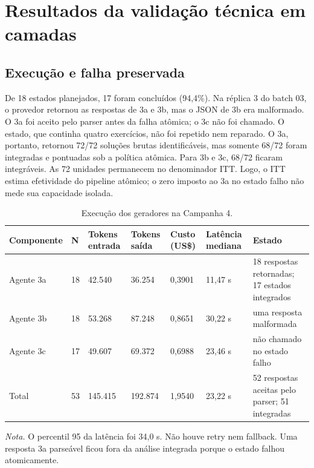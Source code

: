 \documentclass[11pt,a4paper]{article}
\newcommand{\ITT}{ITT}
\begin{document}
\section{Resultados da validação técnica em camadas}

\subsection{Execução e falha preservada}

De 18 estados planejados, 17 foram concluídos (94,4\%). Na réplica 3 do batch 03, o provedor retornou as respostas de 3a e 3b, mas o JSON de 3b era malformado. O 3a foi aceito pelo parser antes da falha atômica; o 3c não foi chamado. O estado, que continha quatro exercícios, não foi repetido nem reparado. O 3a, portanto, retornou 72/72 soluções brutas identificáveis, mas somente 68/72 foram integradas e pontuadas sob a política atômica. Para 3b e 3c, 68/72 ficaram integráveis. As 72 unidades permanecem no denominador \ITT. Logo, o \ITT{} estima efetividade do pipeline atômico; o zero imposto ao 3a no estado falho não mede sua capacidade isolada.

\begin{table}[H]
\centering
\caption{Execução dos geradores na Campanha 4.}
\label{tab:execution}
\footnotesize
\setlength{\tabcolsep}{3pt}
\begin{tabularx}{\textwidth}{@{}P{1.8cm}R{1.15cm}R{1.45cm}R{1.45cm}R{1.55cm}R{1.55cm}Y@{}}
\toprule
Componente & N & Tokens entrada & Tokens saída & Custo (US\$) & Latência mediana & Estado \\
\midrule
Agente 3a & 18 & 42.540 & 36.254 & 0,3901 & 11,47 s & 18 respostas retornadas; 17 estados integrados \\
Agente 3b & 18 & 53.268 & 87.248 & 0,8651 & 30,22 s & uma resposta malformada \\
Agente 3c & 17 & 49.607 & 69.372 & 0,6988 & 23,46 s & não chamado no estado falho \\
\midrule
Total & 53 & 145.415 & 192.874 & 1,9540 & 23,22 s & 52 respostas aceitas pelo parser; 51 integradas \\
\bottomrule
\end{tabularx}
\begin{minipage}{\textwidth}\footnotesize\emph{Nota.} O percentil 95 da latência foi 34,0 s. Não houve retry nem fallback. Uma resposta 3a parseável ficou fora da análise integrada porque o estado falhou atomicamente.
\end{minipage}
\end{table}
\end{document}
